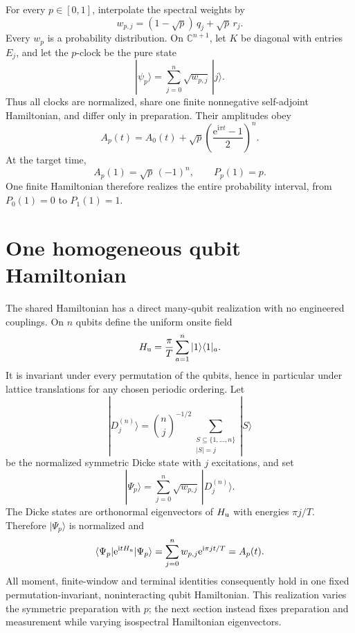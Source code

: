 \documentclass[12pt]{article}
\newcommand{\C}{\mathbb C}
\newcommand{\ee}{\mathrm e}
\newcommand{\ii}{\mathrm i}
\begin{document}
For every \(p\in[0,1]\), interpolate the spectral weights by
\begin{equation}
 w_{p,j}=(1-\sqrt p)\,q_j+\sqrt p\,r_j.
\label{eq:interpolation}
\end{equation}
Every \(w_p\) is a probability distribution. On \(\C^{n+1}\), let \(K\) be
diagonal with entries \(E_j\), and let the \(p\)-clock be the pure state
\begin{equation}
 |\psi_p\rangle=\sum_{j=0}^{n}\sqrt{w_{p,j}}\,|j\rangle .
\label{eq:state}
\end{equation}
Thus all clocks are normalized, share one finite nonnegative self-adjoint
Hamiltonian, and differ only in preparation. Their amplitudes obey
\begin{equation}
 A_p(t)=A_0(t)+\sqrt p
 \left(\frac{\ee^{\ii\pi t}-1}{2}\right)^n .
\label{eq:Ap}
\end{equation}
At the target time,
\begin{equation}
 A_p(1)=\sqrt p\,(-1)^n,\qquad P_p(1)=p.
\label{eq:allfutures}
\end{equation}
One finite Hamiltonian therefore realizes the entire probability interval,
from \(P_0(1)=0\) to \(P_1(1)=1\).

\section*{One homogeneous qubit Hamiltonian}

The shared Hamiltonian has a direct many-qubit realization with no
engineered couplings. On \(n\) qubits define the uniform onsite field
\begin{equation}
 H_{\rm u}=\frac{\pi}{T}\sum_{a=1}^{n}
 |1\rangle\langle1|_a .
\label{eq:uniformfield}
\end{equation}
It is invariant under every permutation of the qubits, hence in particular
under lattice translations for any chosen periodic ordering. Let
\[
 |D_j^{(n)}\rangle={n\choose j}^{-1/2}
 \sum_{\substack{S\subseteq\{1,\ldots,n\}\\|S|=j}}|S\rangle
\]
be the normalized symmetric Dicke state with \(j\) excitations, and set
\begin{equation}
 |\Psi_p\rangle=\sum_{j=0}^{n}\sqrt{w_{p,j}}\,
 |D_j^{(n)}\rangle .
\label{eq:symmetricqubitstate}
\end{equation}
The Dicke states are orthonormal eigenvectors of \(H_{\rm u}\) with
energies \(\pi j/T\). Therefore \(|\Psi_p\rangle\) is normalized and
\[
 \langle\Psi_p|\ee^{\ii tH_{\rm u}}|\Psi_p\rangle
 =\sum_{j=0}^{n}w_{p,j}\ee^{\ii\pi jt/T}=A_p(t).
\]
All moment, finite-window and terminal identities consequently hold in one
fixed permutation-invariant, noninteracting qubit Hamiltonian. This
realization varies the symmetric preparation with \(p\); the next section
instead fixes preparation and measurement while varying isospectral
Hamiltonian eigenvectors.
\end{document}
